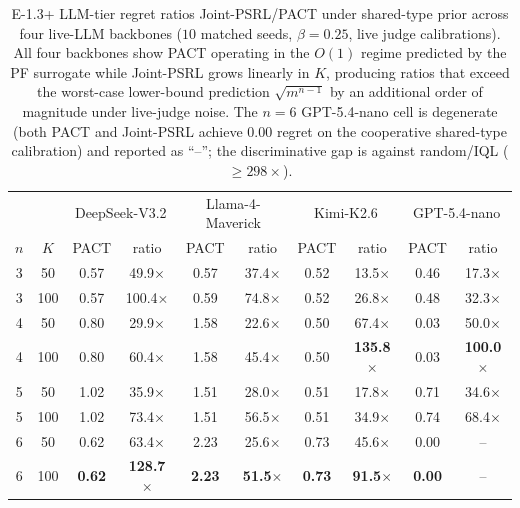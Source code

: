 \begin{table}[t]
\centering
\caption{E-1.3+ LLM-tier regret ratios Joint-PSRL/PACT under shared-type prior across four live-LLM backbones ($10$ matched seeds, $\beta{=}0.25$, live judge calibrations). All four backbones show PACT operating in the $O(1)$ regime predicted by the PF surrogate while Joint-PSRL grows linearly in $K$, producing ratios that exceed the worst-case lower-bound prediction $\sqrt{m^{n-1}}$ by an additional order of magnitude under live-judge noise. The $n{=}6$ GPT-5.4-nano cell is degenerate (both PACT and Joint-PSRL achieve $0.00$ regret on the cooperative shared-type calibration) and reported as ``--''; the discriminative gap is against random/IQL ($\geq\!298\times$).}\label{tab:wave2-lb-ratio-llm}
\small
\setlength{\tabcolsep}{3pt}
\begin{tabular}{cccccccccc}
\toprule
 & & \multicolumn{2}{c}{DeepSeek-V3.2} & \multicolumn{2}{c}{Llama-4-Maverick} & \multicolumn{2}{c}{Kimi-K2.6} & \multicolumn{2}{c}{GPT-5.4-nano} \\
$n$ & $K$ & PACT & ratio & PACT & ratio & PACT & ratio & PACT & ratio \\
\midrule
3 & 50  & 0.57 & 49.9$\times$  & 0.57 & 37.4$\times$  & 0.52 & 13.5$\times$  & 0.46 & 17.3$\times$  \\
3 & 100 & 0.57 & 100.4$\times$ & 0.59 & 74.8$\times$  & 0.52 & 26.8$\times$  & 0.48 & 32.3$\times$  \\
4 & 50  & 0.80 & 29.9$\times$  & 1.58 & 22.6$\times$  & 0.50 & 67.4$\times$  & 0.03 & 50.0$\times$  \\
4 & 100 & 0.80 & 60.4$\times$  & 1.58 & 45.4$\times$  & 0.50 & \textbf{135.8}$\times$ & 0.03 & \textbf{100.0}$\times$ \\
5 & 50  & 1.02 & 35.9$\times$  & 1.51 & 28.0$\times$  & 0.51 & 17.8$\times$  & 0.71 & 34.6$\times$  \\
5 & 100 & 1.02 & 73.4$\times$  & 1.51 & 56.5$\times$  & 0.51 & 34.9$\times$  & 0.74 & 68.4$\times$  \\
6 & 50  & 0.62 & 63.4$\times$  & 2.23 & 25.6$\times$  & 0.73 & 45.6$\times$  & 0.00 & --             \\
6 & 100 & \textbf{0.62} & \textbf{128.7}$\times$ & \textbf{2.23} & \textbf{51.5}$\times$ & \textbf{0.73} & \textbf{91.5}$\times$ & \textbf{0.00} & -- \\
\bottomrule
\end{tabular}
\end{table}


